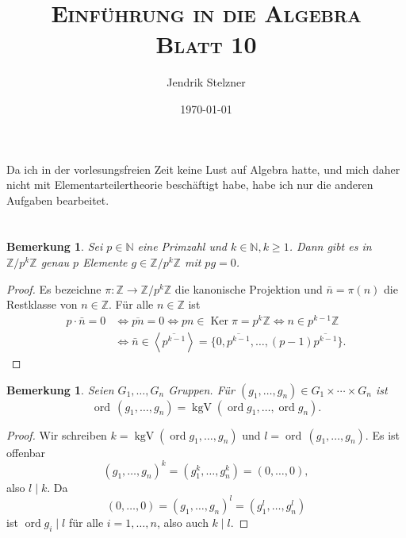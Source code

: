 \documentclass[a4paper,10pt]{article}
\title{\textsc{Einführung in die Algebra \\ \Large Blatt 10}}
\author{Jendrik Stelzner}
\date{\today}
\newcounter{satze}
\newtheorem{bem}[satze]{Bemerkung}
\theoremstyle{definition}
\newcommand{\N}{\mathbb{N}}
\newcommand{\Z}{\mathbb{Z}}
\newcommand{\ord}{\operatorname{ord}}
\newcommand{\kgV}{\operatorname{kgV}}
\newcommand{\Ker}{\operatorname{Ker}}
\newcommand{\gen}[1]{\left\langle#1\right\rangle}
\begin{document}
\maketitle





\section{}
Da ich in der vorlesungsfreien Zeit keine Lust auf Algebra hatte, und mich daher nicht mit Elementarteilertheorie beschäftigt habe, habe ich nur die anderen Aufgaben bearbeitet.





\section{}


\begin{bem}\label{bem: elemente der ordnung p}
 Sei $p \in \N$ eine Primzahl und $k \in \N, k \geq 1$. Dann gibt es in $\Z/p^k\Z$ genau $p$ Elemente $g \in \Z/p^k\Z$ mit $pg = 0$.
\end{bem}
\begin{proof}
 Es bezeichne $\pi : \Z \rightarrow \Z/p^k\Z$ die kanonische Projektion und $\bar{n} = \pi(n)$ die Restklasse von $n \in \Z$. Für alle $n \in \Z$ ist
 \begin{align*}
  p \cdot \bar{n} = 0
  &\Leftrightarrow \overline{pn} = 0
  \Leftrightarrow pn \in \Ker \pi = p^k\Z
  \Leftrightarrow n \in p^{k-1}\Z \\
  &\Leftrightarrow \bar{n} \in \gen{\overline{p^{k-1}}} =  \{0,\overline{p^{k-1}},\ldots,(p-1)\overline{p^{k-1}}\}.
 \end{align*}
\end{proof}


\begin{bem}\label{bem: Ordnung im Produkt}
 Seien $G_1, \ldots, G_n$ Gruppen. Für $(g_1, \ldots, g_n) \in G_1 \times \cdots \times G_n$ ist
 \[
  \ord\, (g_1, \ldots, g_n) = \kgV(\ord g_1, \ldots, \ord g_n).
 \]
\end{bem}
\begin{proof}
 Wir schreiben $k = \kgV(\ord g_1, \ldots, g_n)$ und $l = \ord\, (g_1, \ldots, g_n)$. Es ist offenbar
 \[
  (g_1, \ldots, g_n)^k = (g_1^k, \ldots, g_n^k) = (0, \ldots, 0),
 \]
 also $l \mid k$. Da
 \[
  (0, \ldots, 0) = (g_1, \ldots, g_n)^l = (g_1^l, \ldots, g_n^l)
 \]
 ist $\ord g_i \mid l$ für alle $i = 1, \ldots, n$, also auch $k \mid l$.
\end{proof}
\end{document}
